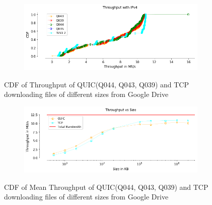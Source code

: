 \begin{frame}

\begin{figure}[!htb]
    \centering
    \begin{subfigure}{0.45\textwidth}
        \includegraphics[width=\linewidth]{./plots/PI/gdrive/Throughput_ipv4.png}
    \end{subfigure}   
    \caption{CDF of Throughput of QUIC(Q044, Q043, Q039) and TCP downloading files of different sizes from Google Drive}\label{fig:cdf-of-throughput}
\end{figure}

\begin{figure}[!htb]
    \centering
    \begin{subfigure}{0.45\textwidth}
        \includegraphics[width=\linewidth]{./plots/PI/gdrive/MeanThroughputvssize.png}
    \end{subfigure}   
    \caption{CDF of Mean Throughput of QUIC(Q044, Q043, Q039) and TCP downloading files of different sizes from Google Drive}\label{fig:cdf-of-mean}
\end{figure}


\end{frame}
\clearpage

